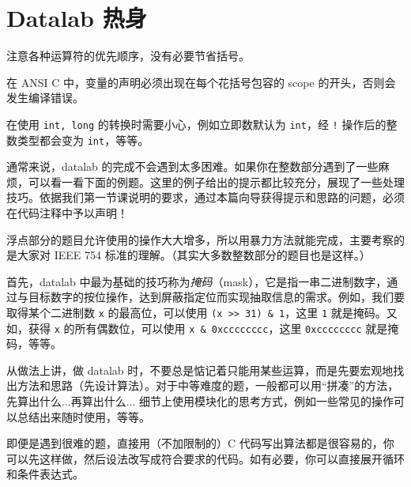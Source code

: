 \chapter{Datalab 热身}
    \begin{help}
        \begin{compactitem}
            \item 注意各种运算符的优先顺序，没有必要节省括号。
            \item 在 ANSI C 中，变量的声明必须出现在每个花括号包容的 scope 的开头，否则会发生编译错误。
            \item 在使用 \texttt{int, long} 的转换时需要小心，例如立即数默认为 \texttt{int}，经 \texttt{!} 操作后的整数类型都会变为 \texttt{int}，等等。
            \item 通常来说，datalab 的完成不会遇到太多困难。如果你在整数部分遇到了一些麻烦，可以看一看下面的例题。这里的例子给出的提示都比较充分，展现了一些处理技巧。依据我们第一节课说明的要求，通过本篇向导获得提示和思路的问题，必须在代码注释中予以声明！
            \item 浮点部分的题目允许使用的操作大大增多，所以用暴力方法就能完成，主要考察的是大家对 IEEE 754 标准的理解。（其实大多数整数部分的题目也是这样。）
        \end{compactitem}
    \end{help}

    首先，datalab 中最为基础的技巧称为\emph{掩码}（mask），它是指一串二进制数字，通过与目标数字的按位操作，达到屏蔽指定位而实现抽取信息的需求。例如，我们要取得某个二进制数 \texttt{x} 的最高位，可以使用 \verb|(x >> 31) & 1|，这里 \texttt{1} 就是掩码。又如，获得 \texttt{x} 的所有偶数位，可以使用 \verb|x & 0xcccccccc|，这里 \texttt{0xcccccccc} 就是掩码，等等。

    从做法上讲，做 datalab 时，不要总是惦记着只能用某些运算，而是先要宏观地找出方法和思路（先设计算法）。对于中等难度的题，一般都可以用“拼凑”的方法，先算出什么...再算出什么... 细节上使用模块化的思考方式，例如一些常见的操作可以总结出来随时使用，等等。
    
    即便是遇到很难的题，直接用（不加限制的）C 代码写出算法都是很容易的，你可以先这样做，然后设法改写成符合要求的代码。如有必要，你可以直接展开循环和条件表达式。


